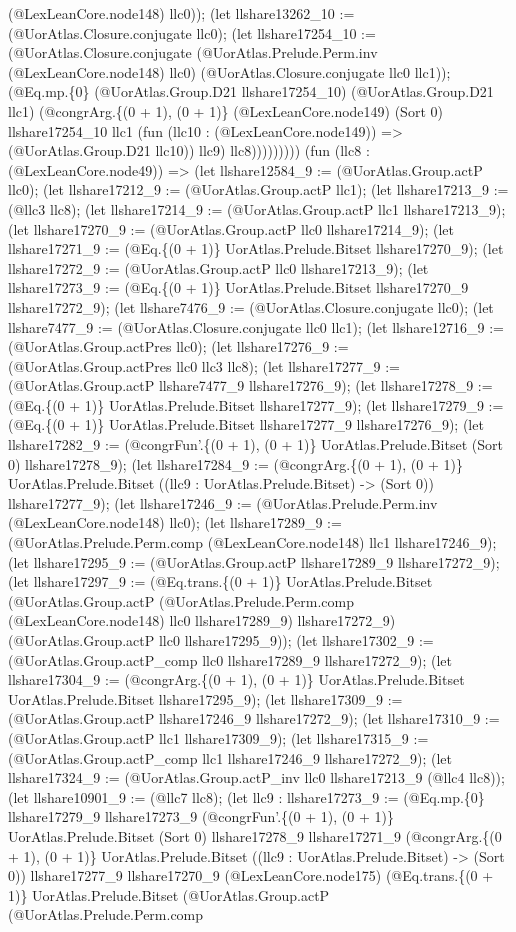 \documentclass[11pt]{article}
\begin{document}
(@LexLeanCore.node148) llc0)); (let llshare13262\_10 := (@UorAtlas.Closure.conjugate llc0); (let llshare17254\_10 := (@UorAtlas.Closure.conjugate (@UorAtlas.Prelude.Perm.inv (@LexLeanCore.node148) llc0) (@UorAtlas.Closure.conjugate llc0 llc1)); (@Eq.mp.\{0\} (@UorAtlas.Group.D21 llshare17254\_10) (@UorAtlas.Group.D21 llc1) (@congrArg.\{(0 + 1), (0 + 1)\} (@LexLeanCore.node149) (Sort 0) llshare17254\_10 llc1 (fun (llc10 : (@LexLeanCore.node149)) => (@UorAtlas.Group.D21 llc10)) llc9) llc8))))))))) (fun (llc8 : (@LexLeanCore.node49)) => (let llshare12584\_9 := (@UorAtlas.Group.actP llc0); (let llshare17212\_9 := (@UorAtlas.Group.actP llc1); (let llshare17213\_9 := (@llc3 llc8); (let llshare17214\_9 := (@UorAtlas.Group.actP llc1 llshare17213\_9); (let llshare17270\_9 := (@UorAtlas.Group.actP llc0 llshare17214\_9); (let llshare17271\_9 := (@Eq.\{(0 + 1)\} UorAtlas.Prelude.Bitset llshare17270\_9); (let llshare17272\_9 := (@UorAtlas.Group.actP llc0 llshare17213\_9); (let llshare17273\_9 := (@Eq.\{(0 + 1)\} UorAtlas.Prelude.Bitset llshare17270\_9 llshare17272\_9); (let llshare7476\_9 := (@UorAtlas.Closure.conjugate llc0); (let llshare7477\_9 := (@UorAtlas.Closure.conjugate llc0 llc1); (let llshare12716\_9 := (@UorAtlas.Group.actPres llc0); (let llshare17276\_9 := (@UorAtlas.Group.actPres llc0 llc3 llc8); (let llshare17277\_9 := (@UorAtlas.Group.actP llshare7477\_9 llshare17276\_9); (let llshare17278\_9 := (@Eq.\{(0 + 1)\} UorAtlas.Prelude.Bitset llshare17277\_9); (let llshare17279\_9 := (@Eq.\{(0 + 1)\} UorAtlas.Prelude.Bitset llshare17277\_9 llshare17276\_9); (let llshare17282\_9 := (@congrFun'.\{(0 + 1), (0 + 1)\} UorAtlas.Prelude.Bitset (Sort 0) llshare17278\_9); (let llshare17284\_9 := (@congrArg.\{(0 + 1), (0 + 1)\} UorAtlas.Prelude.Bitset ((llc9 : UorAtlas.Prelude.Bitset) -> (Sort 0)) llshare17277\_9); (let llshare17246\_9 := (@UorAtlas.Prelude.Perm.inv (@LexLeanCore.node148) llc0); (let llshare17289\_9 := (@UorAtlas.Prelude.Perm.comp (@LexLeanCore.node148) llc1 llshare17246\_9); (let llshare17295\_9 := (@UorAtlas.Group.actP llshare17289\_9 llshare17272\_9); (let llshare17297\_9 := (@Eq.trans.\{(0 + 1)\} UorAtlas.Prelude.Bitset (@UorAtlas.Group.actP (@UorAtlas.Prelude.Perm.comp (@LexLeanCore.node148) llc0 llshare17289\_9) llshare17272\_9) (@UorAtlas.Group.actP llc0 llshare17295\_9)); (let llshare17302\_9 := (@UorAtlas.Group.actP\_comp llc0 llshare17289\_9 llshare17272\_9); (let llshare17304\_9 := (@congrArg.\{(0 + 1), (0 + 1)\} UorAtlas.Prelude.Bitset UorAtlas.Prelude.Bitset llshare17295\_9); (let llshare17309\_9 := (@UorAtlas.Group.actP llshare17246\_9 llshare17272\_9); (let llshare17310\_9 := (@UorAtlas.Group.actP llc1 llshare17309\_9); (let llshare17315\_9 := (@UorAtlas.Group.actP\_comp llc1 llshare17246\_9 llshare17272\_9); (let llshare17324\_9 := (@UorAtlas.Group.actP\_inv llc0 llshare17213\_9 (@llc4 llc8)); (let llshare10901\_9 := (@llc7 llc8); (let llc9 : llshare17273\_9 := (@Eq.mp.\{0\} llshare17279\_9 llshare17273\_9 (@congrFun'.\{(0 + 1), (0 + 1)\} UorAtlas.Prelude.Bitset (Sort 0) llshare17278\_9 llshare17271\_9 (@congrArg.\{(0 + 1), (0 + 1)\} UorAtlas.Prelude.Bitset ((llc9 : UorAtlas.Prelude.Bitset) -> (Sort 0)) llshare17277\_9 llshare17270\_9 (@LexLeanCore.node175) (@Eq.trans.\{(0 + 1)\} UorAtlas.Prelude.Bitset (@UorAtlas.Group.actP (@UorAtlas.Prelude.Perm.comp 
\end{document}
